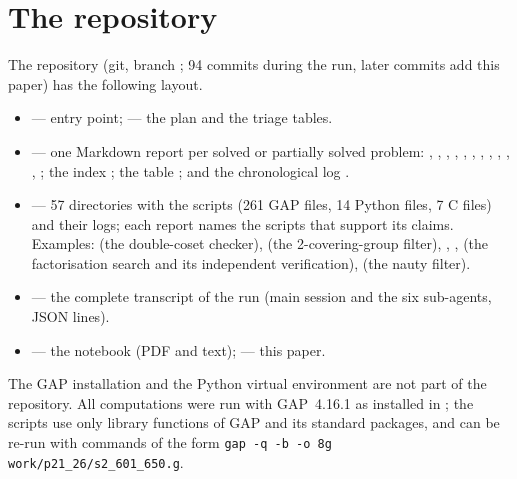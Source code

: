 \section{The repository}\label{app:repo}

The repository (git, branch ; 94 commits during the run, later commits add this paper) has the following layout.
\begin{itemize}
\item {} --- entry point;  --- the plan and the triage tables.
\item {} --- one Markdown report per solved or partially solved problem:
, ,
, ,
, , ,
, , , ,
; the index ; the table ; and
the chronological log .
\item {} --- 57 directories with the scripts (261 GAP files, 14 Python files, 7 C files) and
their logs; each report names the scripts that support its claims. Examples:  (the
double-coset checker),  (the 2-covering-group filter),
, ,  (the factorisation search and its independent
verification),  (the nauty filter).
\item {} --- the complete transcript of the run (main session and the six sub-agents, JSON lines).
\item {} --- the notebook (PDF and text);  --- this paper.
\end{itemize}
The GAP installation and the Python virtual environment are not part of the repository. All computations were run
with GAP~4.16.1 as installed in ; the scripts use only library functions of GAP and its standard
packages, and can be re-run with commands of the form
\texttt{gap -q -b -o 8g work/p21\_26/s2\_601\_650.g}.
